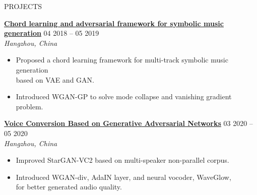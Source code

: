 \documentclass{resume}
\begin{document}
\vspace{-1em}
\begin{rSection}{PROJECTS}
\vspace{-1.25em}
    \item \textbf{\href{https://docs.google.com/presentation/d/1797idRRmgeD2JnUslGbflmGUO2X5lMY6/edit?usp=drive_link&ouid=101248488395326982475&rtpof=true&sd=true}{\textbf{\large{\underline{Chord learning and adversarial framework for symbolic music generation}}}}} \hfill {04 2018 -- 05 2019}\\
    \mbox{} \hfill \textit{Hangzhou, China}
    \begin{itemize}
        \item Proposed a chord learning framework for multi-track symbolic music generation\\based on VAE and GAN.
        \item Introduced WGAN-GP to solve mode collapse and vanishing gradient problem.
    \end{itemize}

    \item \textbf{\href{https://drive.google.com/file/d/1736XHtaeT58FL_gbOa9XjlyA6xAXDkg2/view?usp=drive_link}{\textbf{\large{\underline{Voice Conversion Based on Generative Adversarial Networks}}}}} \hfill {03 2020 -- 05 2020}\\
    \mbox{} \hfill \textit{Hangzhou, China}
    \begin{itemize}
        \item Improved StarGAN-VC2 based on multi-speaker non-parallel corpus.
        \item Introduced WGAN-div, AdaIN layer, and neural vocoder, WaveGlow,\\for better generated audio quality.
    \end{itemize}
    

\end{rSection}
\end{document}
